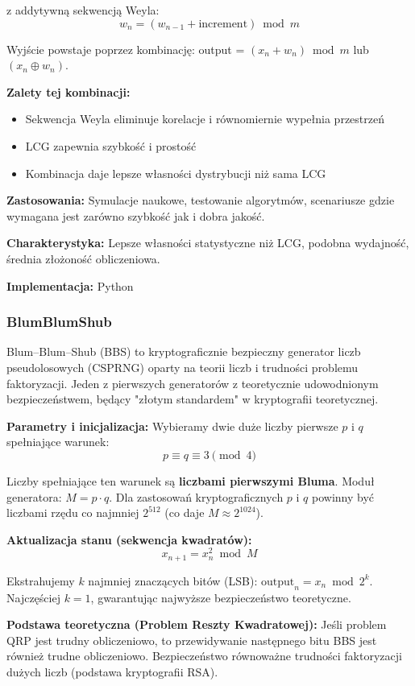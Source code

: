 \documentclass[12pt,a4paper]{article}
\begin{document}
z addytywną sekwencją Weyla:
$$w_n = (w_{n-1} + \text{increment}) \bmod m$$

Wyjście powstaje poprzez kombinację: output = $(x_n + w_n) \bmod m$ lub $(x_n \oplus w_n)$.

\textbf{Zalety tej kombinacji:}
\begin{itemize}
    \item Sekwencja Weyla eliminuje korelacje i równomiernie wypełnia przestrzeń
    \item LCG zapewnia szybkość i prostość
    \item Kombinacja daje lepsze własności dystrybucji niż sama LCG
\end{itemize}

\textbf{Zastosowania:} Symulacje naukowe, testowanie algorytmów, scenariusze gdzie wymagana jest zarówno szybkość jak i dobra jakość.

\textbf{Charakterystyka:} Lepsze własności statystyczne niż LCG, podobna wydajność, średnia złożoność obliczeniowa.

\textbf{Implementacja:} Python

\subsubsection{BlumBlumShub}

Blum–Blum–Shub (BBS) to kryptograficznie bezpieczny generator liczb pseudolosowych (CSPRNG) oparty na teorii liczb i trudności problemu faktoryzacji. Jeden z pierwszych generatorów z teoretycznie udowodnionym bezpieczeństwem, będący "złotym standardem" w kryptografii teoretycznej.

\textbf{Parametry i inicjalizacja:} Wybieramy dwie duże liczby pierwsze $p$ i $q$ spełniające warunek:
$$p \equiv q \equiv 3 \pmod{4}$$

Liczby spełniające ten warunek są \textbf{liczbami pierwszymi Bluma}. Moduł generatora: $M = p \cdot q$. Dla zastosowań kryptograficznych $p$ i $q$ powinny być liczbami rzędu co najmniej $2^{512}$ (co daje $M \approx 2^{1024}$).

\textbf{Aktualizacja stanu (sekwencja kwadratów):}
$$x_{n+1} = x_n^2 \bmod M$$

Ekstrahujemy $k$ najmniej znaczących bitów (LSB): $\text{output}_n = x_n \bmod 2^k$. Najczęściej $k=1$, gwarantując najwyższe bezpieczeństwo teoretyczne.

\textbf{Podstawa teoretyczna (Problem Reszty Kwadratowej):} Jeśli problem QRP jest trudny obliczeniowo, to przewidywanie następnego bitu BBS jest również trudne obliczeniowo. Bezpieczeństwo równoważne trudności faktoryzacji dużych liczb (podstawa kryptografii RSA).
\end{document}
